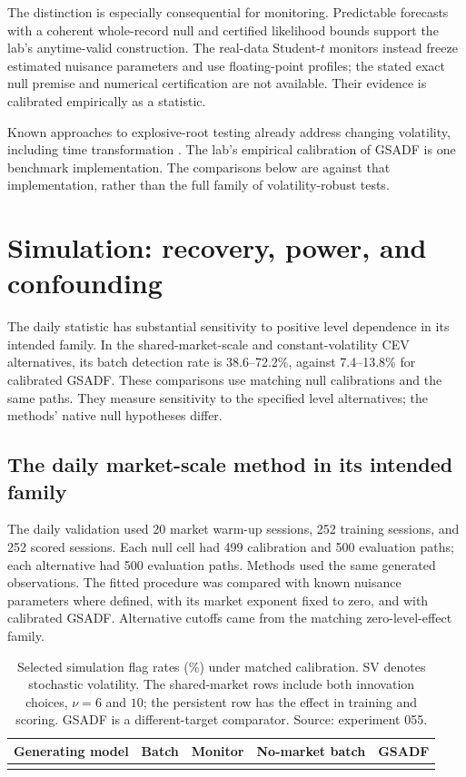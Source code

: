 The distinction is especially consequential for monitoring. Predictable
forecasts with a coherent whole-record null and certified likelihood bounds
support the lab's anytime-valid construction. The real-data Student-$t$
monitors instead freeze estimated nuisance parameters and use floating-point
profiles; the stated exact null premise and numerical certification are not
available. Their evidence is calibrated empirically as a statistic.

Known approaches to explosive-root testing already address changing
volatility, including time transformation
\cite{kurozumi2021time}. The lab's empirical calibration of GSADF is one
benchmark implementation. The comparisons below are against that
implementation, rather than the full family of volatility-robust tests.

\section{Simulation: recovery, power, and confounding}\label{sec:simulation}
The daily statistic has substantial sensitivity to positive level dependence
in its intended family. In the shared-market-scale and constant-volatility
CEV alternatives, its batch detection rate is 38.6--72.2\%, against
7.4--13.8\% for calibrated GSADF. These comparisons use matching null
calibrations and the same paths. They measure sensitivity to the specified
level alternatives; the methods' native null hypotheses differ.

\subsection{The daily market-scale method in its intended family}
The daily validation used 20 market warm-up sessions, 252 training sessions,
and 252 scored sessions. Each null cell had 499 calibration and 500
evaluation paths; each alternative had 500 evaluation paths. Methods used
the same generated observations. The fitted procedure was compared with
known nuisance parameters where defined, with its market exponent fixed to
zero, and with calibrated GSADF. Alternative cutoffs came from the matching
zero-level-effect family.

\begin{table}[htbp]\centering\small
\begin{tabularx}{\linewidth}{@{}Yrrrr@{}}\toprule
Generating model & Batch & Monitor & No-market batch & GSADF\\
\midrule
{}
\bottomrule\end{tabularx}
\caption{Selected simulation flag rates (\%) under matched calibration.
SV denotes stochastic volatility. The shared-market rows include both
innovation choices, $\nu=6$ and $10$; the persistent row has the effect in
training and scoring. GSADF is a
different-target comparator. Source: experiment 055.}\label{tab:sim}
\end{table}


